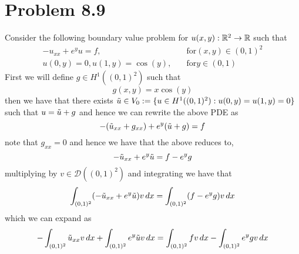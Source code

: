 \documentclass[12pt]{report}
\begin{document}
\section*{Problem 8.9}
Consider the following boundary value problem for $u(x,y): \mathbb{R}^2 \to \mathbb{R}$ such that
\begin{align*}
  -u_{xx} + e^yu = f, \quad &\text{for} (x,y) \in (0,1)^2 \\
  u(0,y) = 0, u(1,y) = \cos(y), \quad &\text{for} y\in(0,1)
\end{align*}
First we will define $g \in H^1((0,1)^2)$ such that
\begin{equation*}
  g(x,y) = x\cos(y)
\end{equation*}
then we have that there exists $\Tilde{u} \in V_0 := \{u \in H^1((0,1)^2): u(0,y)= u(1,y) = 0\}$ such that $u = \Tilde{u} + g$ and hence we can rewrite the above PDE as
\begin{equation*}
  -(\Tilde{u}_{xx} + g_{xx}) + e^y(\Tilde{u} + g) = f
\end{equation*}
note that $g_{xx} = 0$ and hence we have that the above reduces to,
\begin{equation*}
  -\Tilde{u}_{xx} + e^y\Tilde{u} = f-e^yg
\end{equation*}
multiplying by $v \in \mathcal{D}((0,1)^2)$ and integrating we have that
\begin{equation*}
  \int_{(0,1)^2} (-\Tilde{u}_{xx} + e^y\Tilde{u})v \, dx = \int_{(0,1)^2} (f-e^yg)v \, dx
\end{equation*}
which we can expand as
\begin{equation*}
  -\int_{(0,1)^2} \Tilde{u}_{xx}v \,dx + \int_{(0,1)^2} e^y\Tilde{u}v \, dx = \int_{(0,1)^2} fv \,dx - \int_{(0,1)^2} e^ygv \, dx
\end{equation*}
\end{document}

